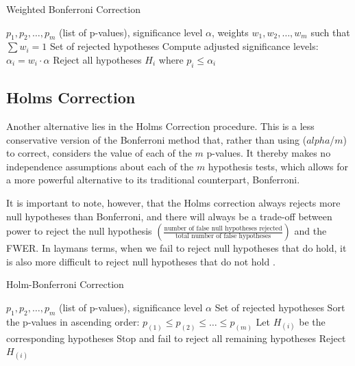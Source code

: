 \documentclass[12pt]{article}
\begin{document}
\par

\begin{algorithm}
    \caption{Weighted Bonferroni Correction}
    \begin{algorithmic}[1]
        \Require $p_1, p_2, \dots, p_m$ (list of p-values), significance level $\alpha$, weights $w_1, w_2, \dots, w_m$ such that $\sum w_i = 1$
        \Ensure Set of rejected hypotheses
        \State Compute adjusted significance levels: $\alpha_i = w_i \cdot \alpha$
        \State Reject all hypotheses $H_i$ where $p_i \leq \alpha_i$
    \end{algorithmic}
\end{algorithm}

\subsection{Holms Correction}
Another alternative lies in the Holms Correction procedure. This is a less conservative version of the Bonferroni method that, rather than using ($alpha$/$m$) to correct, considers the value of each of the $m$ p-values. It thereby makes no independence assumptions about each of the $m$ hypothesis tests, which allows for a more powerful alternative to its traditional counterpart, Bonferroni. \par

It is important to note, however, that the Holms correction always rejects more null hypotheses than Bonferroni, and there will always be a trade-off between power to reject the null hypothesis \(\left( \frac{\text{number of false null hypotheses rejected}}{\text{total number of false hypotheses}} \right)\) and the FWER. In laymans terms, when we fail to reject null hypotheses that do hold, it is also more difficult to reject null hypotheses that do not hold \cite{James2021}. \par

\begin{algorithm}
    \caption{Holm-Bonferroni Correction}
    \begin{algorithmic}[1]
        \Require $p_1, p_2, \dots, p_m$ (list of p-values), significance level $\alpha$
        \Ensure Set of rejected hypotheses
        \State Sort the p-values in ascending order: $p_{(1)} \leq p_{(2)} \leq \dots \leq p_{(m)}$
        \State Let $H_{(i)}$ be the corresponding hypotheses
                \State Stop and fail to reject all remaining hypotheses
            \Else
                \State Reject $H_{(i)}$
            \EndIf
        \EndFor
    \end{algorithmic}
\end{algorithm}
\end{document}
